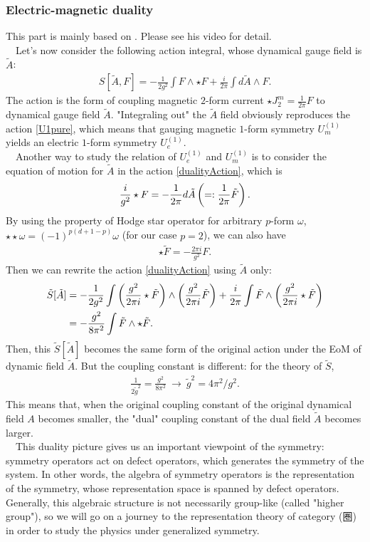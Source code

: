 \documentclass{ltjsarticle}
\theoremstyle{mystyle} %
\numberwithin{equation}{section}
\begin{document}
\subsubsection{Electric-magnetic duality}
This part is mainly based on \cite{TD}. Please see his video for detail. \\
　Let's now consider the following action integral, whose dynamical gauge field is $\tilde{A}$:
\begin{align}
    S[\tilde{A}, F]
    =-\frac{1}{2g^2}\int F\wedge \star F + \frac{i}{2\pi}\int d\tilde{A}\wedge F. 
\label{dualityAction}
\end{align}
The action is the form of coupling magnetic $2$-form current $\star J^{m}_2 = \frac{1}{2\pi}F$ to dynamical gauge field $\tilde{A}$. 
"Integraling out" the $\tilde{A}$ field obviously reproduces the action \eqref{U1pure}, 
which means that 
gauging magnetic $1$-form symmetry $U^{(1)}_m$ yields an electric $1$-form symmetry $U^{(1)}_e$. \\
　Another way to study the relation of $U^{(1)}_e$ and $U^{(1)}_m$ is to consider the equation of motion for $\tilde{A}$ in the action \eqref{dualityAction}, 
which is
\begin{align}
    \frac{i}{g^2}\star F = -\frac{1}{2\pi}d\tilde{A} \left({=: \frac{1}{2\pi}\tilde{F}}\right). 
\end{align}
By using the property of Hodge star operator for arbitrary $p$-form $\omega$, 
$\star\star \omega = (-1)^{p(d+1-p)}\omega$ (for our case $p=2$), we can also have
\begin{align}
    \star \tilde{F}= -\frac{2\pi i}{g^2}F. 
\end{align}
Then we can rewrite the action \eqref{dualityAction} using $\tilde{A}$ only: 
\begin{align}
    \tilde{S}[\tilde{A}]
    &=-\frac{1}{2g^2}\int \left({\frac{g^2}{2\pi i}\star \tilde{F}}\right)\wedge \left({\frac{g^2}{2\pi i}\tilde{F}}\right) + \frac{i}{2\pi}\int \tilde{F}\wedge \left({\frac{g^2}{2\pi i}\star \tilde{F}}\right)\\
    &=-\frac{g^2}{8\pi^2}\int \tilde{F}\wedge \star \tilde{F}. 
\end{align}
Then, this $\tilde{S}[\tilde{A}]$ becomes the same form of the original action under the EoM of dynamic field $\tilde{A}$. 
But the coupling constant is different: for the theory of $\tilde{S}$, 
\begin{align}
    \frac{1}{2\tilde{g}^2} = \frac{g^2}{8\pi^2} ~\to~\tilde{g}^2 = 4\pi^2 / g^2.  
\end{align}
This means that, when the original coupling constant of the original dynamical field $A$ becomes smaller, 
the "dual" coupling constant of the dual field $\tilde{A}$ becomes larger. \\
　This duality picture gives us an important viewpoint of the symmetry: 
symmetry operators act on defect operators, which generates the symmetry of the system. 
In other words, the algebra of symmetry operators is the representation of the symmetry, 
whose representation space is spanned by defect operators. 
Generally, this algebraic structure is not necessarily group-like 
(called "higher group"), 
so we will go on a journey to the representation theory of category (圏) 
in order to study the physics under generalized symmetry. 
%
%
%
%
%
\newpage
\end{document}
